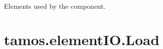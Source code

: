 \documentclass[letterpaper,10pt,english]{sphinxmanual}
\begin{document}
\begin{fulllineitems}
\begin{fulllineitems}
\end{fulllineitems}


\begin{fulllineitems}
\label{\detokenize{generated/tamos.elementIO.Grid:tamos.elementIO.Grid.used_elements}}
\pysigstartsignatures
{}
\pysigstopsignatures
\sphinxAtStartPar
Elements used by the component.

\end{fulllineitems}


\end{fulllineitems}


\sphinxstepscope


\section{tamos.elementIO.Load}
\label{\detokenize{generated/tamos.elementIO.Load:tamos-elementio-load}}\label{\detokenize{generated/tamos.elementIO.Load::doc}}
\end{document}
